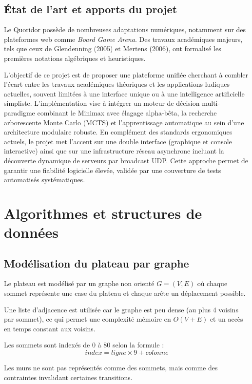 \documentclass[a4paper]{article}
\begin{document}
\subsection{État de l'art et apports du projet}

Le Quoridor possède de nombreuses adaptations numériques, notamment sur des
plateformes web comme \emph{Board Game Arena}. Des travaux académiques majeurs,
tels que ceux de Glendenning (2005) et Mertens (2006), ont formalisé les premières
notations algébriques et heuristiques.

L'objectif de ce projet est de proposer une plateforme unifiée cherchant à combler l'écart entre les travaux académiques théoriques et les applications ludiques actuelles, souvent limitées à une interface unique ou à une intelligence artificielle simpliste. L'implémentation vise à intégrer un moteur de décision multi-paradigme combinant le Minimax avec élagage alpha-bêta, la recherche arborescente Monte Carlo (MCTS) et l'apprentissage automatique au sein d'une architecture modulaire robuste. En complément des standards ergonomiques actuels, le projet met l'accent sur une double interface (graphique et console interactive) ainsi que sur une infrastructure réseau asynchrone incluant la découverte dynamique de serveurs par broadcast UDP. Cette approche permet de garantir une fiabilité logicielle élevée, validée par une couverture de tests automatisés systématiques.

\section{Algorithmes et structures de données}

\subsection{Modélisation du plateau par graphe}

Le plateau est modélisé par un graphe non orienté $G = (V, E)$ où chaque sommet
représente une case du plateau et chaque arête un déplacement possible.

Une liste d'adjacence est utilisée car le graphe est peu dense (au plus 4 voisins par
sommet), ce qui permet une complexité mémoire en $O(V + E)$ et un accès en temps
constant aux voisins.

Les sommets sont indexés de 0 à 80 selon la formule :
\[
index = ligne \times 9 + colonne
\]

Les murs ne sont pas représentés comme des sommets, mais comme des contraintes
invalidant certaines transitions.
\end{document}
